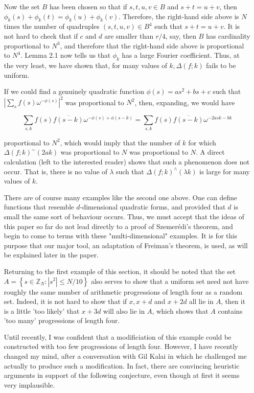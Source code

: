 \documentclass[10pt]{article}
\begin{document}
Now the set $B$ has been chosen so that if $s, t, u, v \in B$ and $s+t=u+v$, then $\phi_{k}(s)+\phi_{k}(t)=\phi_{k}(u)+\phi_{k}(v)$. Therefore, the right-hand side above is $N$ times the number of quadruples $(s, t, u, v) \in B^{4}$ such that $s+t=u+v$. It is not hard to check that if $c$ and $d$ are smaller than $r / 4$, say, then $B$ has cardinality proportional to $N^{3}$, and therefore that the right-hand side above is proportional to $N^{4}$. Lemma 2.1 now tells us that $\phi_{k}$ has a large Fourier coefficient. Thus, at the very least, we have shown that, for many values of $k, \Delta(f ; k)$ fails to be uniform.

If we could find a genuinely quadratic function $\phi(s)=a s^{2}+b s+c$ such that $\left|\sum_{s} f(s) \omega^{-\phi(s)}\right|^{2}$ was proportional to $N^{2}$, then, expanding, we would have

$$
\sum_{s, k} f(s) \overline{f(s-k)} \omega^{-\phi(s)+\phi(s-k)}=\sum_{s, k} f(s) \overline{f(s-k)} \omega^{-2 a s k-b k}
$$

proportional to $N^{2}$, which would imply that the number of $k$ for which $\Delta(f ; k)^{\sim}(2 a k)$ was proportional to $N$ was proportional to $N$. A direct calculation (left to the interested reader) shows that such a phenomenon does not occur. That is, there is no value of $\lambda$ such that $\Delta(f ; k)^{\wedge}(\lambda k)$ is large for many values of $k$.

There are of course many examples like the second one above. One can define functions that resemble $d$-dimensional quadratic forms, and provided that $d$ is small the same sort of behaviour occurs. Thus, we must accept that the ideas of this paper so far do not lead directly to a proof of Szemerédi's theorem, and begin to come to terms with these "multi-dimensional" examples. It is for this purpose that our major tool, an adaptation of Freiman's theorem, is used, as will be explained later in the paper.

Returning to the first example of this section, it should be noted that the set $A=\left\{s \in \mathbb{Z}_{N}:\left|s^{2}\right| \leqslant N / 10\right\}$ also serves to show that a uniform set need not have roughly the same number of arithmetic progressions of length four as a random set. Indeed, it is not hard to show that if $x, x+d$ and $x+2 d$ all lie in $A$, then it is a little 'too likely' that $x+3 d$ will also lie in $A$, which shows that $A$ contains 'too many' progressions of length four.

Until recently, I was confident that a modificiation of this example could be constructed with too few progressions of length four. However, I have recently changed my mind, after a conversation with Gil Kalai in which he challenged me actually to produce such a modification. In fact, there are convincing heuristic arguments in support of the following conjecture, even though at first it seems very implausible.
\end{document}
